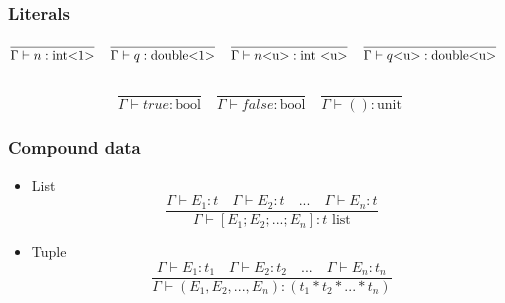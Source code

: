 \documentclass[]{article}
\begin{document}
		\subsubsection{Literals}
		\[
		\frac{}{\Gamma \vdash n: \text{int\textless 1\textgreater}} \quad
		\frac{}{\Gamma \vdash q: \text{double\textless 1\textgreater}} \quad
		\frac{}{\Gamma \vdash n\text{\textless u\textgreater}: \text{int \textless u\textgreater}} \quad
		\frac{}{\Gamma \vdash q\text{\textless u\textgreater}: \text{double\textless u\textgreater}} \quad
		\]\\
		\[
		\frac{}{\Gamma \vdash true: \text{bool}} \quad
		\frac{}{\Gamma \vdash false: \text{bool}} \quad
		\frac{}{\Gamma \vdash (): \text{unit}}
		\]
		
		\subsubsection{Compound data}
		\begin{itemize}
			\item List
			\[
			\frac{\Gamma \vdash E_1: t \quad \Gamma \vdash E_2: t \quad ... \quad 	\Gamma \vdash E_n: t}{\Gamma \vdash [E_1; E_2; ...; E_n]: t \text{ list}}
			\]
			\item Tuple
			\[
			\frac{\Gamma \vdash E_1: t_1 \quad \Gamma \vdash E_2: t_2 \quad ... \quad 	\Gamma \vdash E_n: t_n}{\Gamma \vdash (E_1, E_2, ..., E_n): (t_1 * t_2 * ... * t_n)}
			\]
		\end{itemize}
		
		
\end{document}

